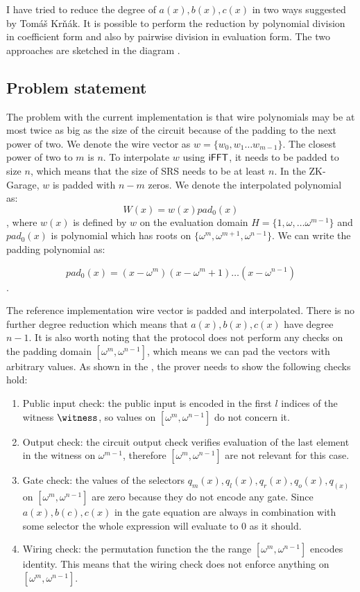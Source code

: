 I have tried to reduce the degree of $a(x), b(x), c(x)$ in two ways suggested by Tomáš Krňák. It is possible to perform the reduction by polynomial division in coefficient form and also by pairwise division in evaluation form. The two approaches are sketched in the diagram .

\subsection{Problem statement} 
The problem with the current implementation is that wire polynomials may be at most twice as big as the size of the circuit because of the padding to the next power of two. We denote the wire vector as $w = \{w_0, w_1 \ldots w_{m-1}\}$. The closest power of two to $m$ is $n$. To interpolate $w$ using $\mathsf{iFFT}$, it needs to be padded to size $n$, which means that the size of SRS needs to be at least $n$. In the ZK-Garage, $w$ is padded with $n-m$ zeros. We denote the interpolated polynomial as: $$W(x) = w(x)pad_0(x)$$,
where $w(x)$ is defined by $w$ on the evaluation domain $H = \{1, \omega, \ldots \omega^{m-1}\}$ and $pad_0(x)$ is polynomial which has roots on $\{\omega^m, \omega^{m+1}, \omega^{n-1}\}$. We can write the padding polynomial as: 

\begin{equation}
    \label{padding-polynomail}
    pad_0(x) = (x - \omega^m)(x - \omega^m+1) \ldots (x - \omega^{n-1})
\end{equation}.

The reference implementation wire vector is padded and interpolated. There is no further degree reduction which means that $a(x), b(x), c(x)$ have degree $n-1$. It is also worth noting that the protocol does not perform any checks on the padding domain  $[\omega^{m}, \omega^{n-1}]$, which means we can pad the vectors with arbitrary values. As shown in the , the prover needs to show the following checks hold:

\begin{enumerate}
    \item Public input check: the public input is encoded in the first $l$ indices of the witness $\witness$, so values on $[\omega^{m}, \omega^{n-1}]$ do not concern it.
    \item Output check: the circuit output check verifies evaluation of the last element in the witness on $\omega^{m-1}$, therefore $[\omega^{m}, \omega^{n-1}]$ are not relevant for this case.
    \item Gate check: the values of the selectors $q_m(x), q_l(x), q_r(x), q_o(x), q_(x)$ on $[\omega^{m}, \omega^{n-1}]$ are zero because they do not encode any gate. Since $a(x), b(c), c(x)$ in the gate equation  are always in combination with some selector the whole expression will evaluate to 0 as it should.
    \item Wiring check: the permutation function the the range $[\omega^{m}, \omega^{n-1}]$ encodes identity. This means that the wiring check does not enforce anything on $[\omega^{m}, \omega^{n-1}]$.
\end{enumerate}

